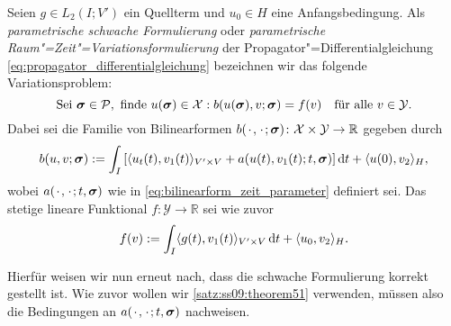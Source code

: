 \begin{Definition}%
\label{definition:parametrische_rz_variationsformulierung}
    Seien $g \in L_{2}(I; V')$ ein Quellterm und $u_{0} \in H$ eine Anfangsbedingung.
    Als \emph{parametrische schwache Formulierung} oder \emph{parametrische Raum"=Zeit"=Variationsformulierung} der Propagator"=Differentialgleichung \cref{eq:propagator_differentialgleichung} bezeichnen wir das folgende Variationsproblem:
    \begin{equation}
    \label{eq:parametrisches_rz_variationsproblem}
        \text{Sei}~\bm\sigma \in \mathcal P,~\text{finde}~u(\bm\sigma) \in \mathcal X : b(u(\bm\sigma), v; \bm\sigma) = f(v) \quad \fa v \in \mathcal Y.
    \end{equation}
    Dabei sei die Familie von Bilinearformen $b({\mkern2mu\cdot\mkern2mu}, {\mkern2mu\cdot\mkern2mu}; \bm\sigma) \colon \mathcal X \times \mathcal Y \to \mathbb{R}$ gegeben durch
     \begin{equation}
     \label{eq:parametrisches_rz_variationsproblem:lhs}
         b(u, v; \bm\sigma)
             := \int_{I} \left[ \skp{u_{t}(t)}{v_{1}(t)}{V' \times V} + a(u(t), v_{1}(t); t, \bm\sigma) \right] \diff t + \skp{u(0)}{v_{2}}{H},
     \end{equation}
     wobei $a({\mkern2mu\cdot\mkern2mu}, {\mkern2mu\cdot\mkern2mu}; t, \bm\sigma)$ wie in \cref{eq:bilinearform_zeit_parameter} definiert sei.
     Das stetige lineare Funktional $f \colon \mathcal Y \to \mathbb{R}$ sei wie zuvor
     \begin{equation}
     \label{eq:parametrisches_rz_variationsproblem:rhs}
         f(v) := \int_{I} \skp{g(t)}{v_{1}(t)}{V' \times V} \diff t + \skp{u_{0}}{v_{2}}{H}.
     \end{equation}
\end{Definition}

Hierfür weisen wir nun erneut nach, dass die schwache Formulierung korrekt gestellt ist.
Wie zuvor wollen wir \cref{satz:ss09:theorem51} verwenden, müssen also die Bedingungen an $a({\mkern2mu\cdot\mkern2mu}, {\mkern2mu\cdot\mkern2mu};t, \bm\sigma)$ nachweisen.

